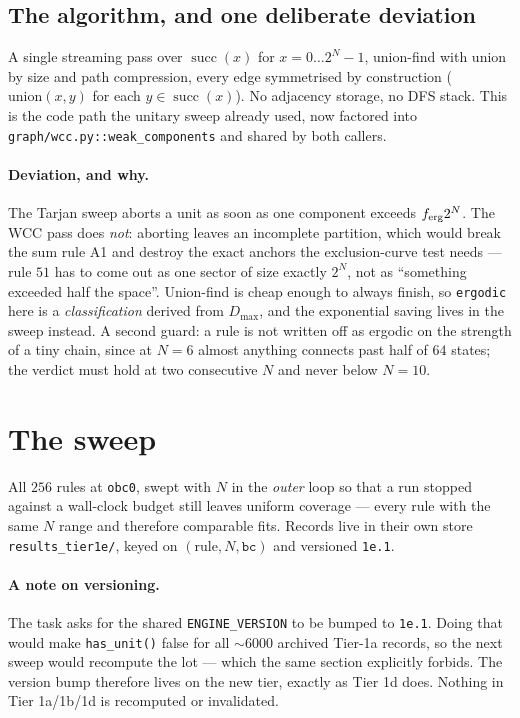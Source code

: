 \documentclass[11pt]{article}
\newcommand{\rt}[1]{\texttt{#1}}
\newcommand{\fn}[1]{\texttt{#1}}
\theoremstyle{plain}
\theoremstyle{definition}
\begin{document}
\subsection{The algorithm, and one deliberate deviation}

A single streaming pass over $\operatorname{succ}(x)$ for
$x=0\ldots2^N-1$, union-find with union by size and path compression, every edge
symmetrised by construction ($\mathrm{union}(x,y)$ for each $y\in
\operatorname{succ}(x)$). No adjacency storage, no DFS stack. This is the code
path the unitary sweep already used, now factored into
\fn{graph/wcc.py::weak\_components} and shared by both callers.

\paragraph{Deviation, and why.} The Tarjan sweep aborts a unit as soon as one
component exceeds $f_{\rm erg}2^N$. The WCC pass does \emph{not}: aborting
leaves an incomplete partition, which would break the sum rule A1 and destroy
the exact anchors the exclusion-curve test needs --- rule $51$ has to come out
as one sector of size exactly $2^N$, not as ``something exceeded half the
space''. Union-find is cheap enough to always finish, so \rt{ergodic} here is a
\emph{classification} derived from $D_{\max}$, and the exponential saving lives
in the sweep instead. A second guard: a rule is not written off as ergodic on
the strength of a tiny chain, since at $N=6$ almost anything connects past half
of $64$ states; the verdict must hold at two consecutive $N$ and never below
$N=10$.

\section{The sweep}
\label{sec:sweep}

All $256$ rules at \rt{obc0}, swept with $N$ in the \emph{outer} loop so that a
run stopped against a wall-clock budget still leaves uniform coverage --- every
rule with the same $N$ range and therefore comparable fits. Records live in
their own store \fn{results\_tier1e/}, keyed on $(\text{rule},N,\rt{bc})$ and
versioned \texttt{1e.1}.

\paragraph{A note on versioning.} The task asks for the shared
\fn{ENGINE\_VERSION} to be bumped to \texttt{1e.1}. Doing that would make
\fn{has\_unit()} false for all ${\sim}6000$ archived Tier-1a records, so the next
sweep would recompute the lot --- which the same section explicitly forbids. The
version bump therefore lives on the new tier, exactly as Tier 1d does. Nothing
in Tier 1a/1b/1d is recomputed or invalidated.
\end{document}
